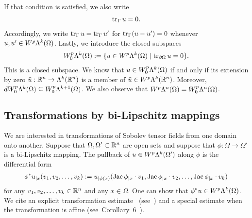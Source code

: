 \documentclass[10pt,a4paper]{article}
\newcommand{\todo}[1]{{\colorbox{yellow}{#1}}}
\newcommand\cye[1]{%
\protect\leavevmode
\begingroup
    \color{blue}%
    #1%
\endgroup
}
\begin{document}
If that condition is satisfied, we also write 
\begin{align*}
    \operatorname{tr}_{\Gamma} u = 0
    .
\end{align*}
Accordingly, we write $\operatorname{tr}_{\Gamma} u = \operatorname{tr}_{\Gamma} u'$ for $\operatorname{tr}_{\Gamma} (u-u') = 0$ whenever $u, u' \in W^{p}\Lambda^{k}(\Omega)$.
Lastly, we introduce the closed subspaces 
\begin{gather*}
    W^{p}_{0}\Alt^{k}(\Omega) 
    := 
    \{ u \in W^{p}\Alt^{k}(\Omega) \suchthat \trace_{\partial \Omega} u = 0 \}
    .
\end{gather*}
This is a closed subspace. We know that $u \in W^{p}_{0}\Lambda^{k}(\Omega)$ if and only if its extension by zero $\tilde u : {\mathbb R}^{n} \rightarrow \Lambda^{k}({\mathbb R}^{n})$ is a member of $\tilde u \in W^{p}\Lambda^{k}({\mathbb R}^{n})$. Moreover, $d W^{p}_{0}\Lambda^{k}(\Omega) \subseteq W^{p}_{0}\Lambda^{k+1}(\Omega)$. We also observe that $W^{p}\Lambda^{n}(\Omega) = W^{p}_{0}\Lambda^{n}(\Omega)$.


\subsection{Transformations by bi-Lipschitz mappings}

We are interested in transformations of Sobolev tensor fields from one domain onto another. 
Suppose that $\Omega,\Omega' \subset {\mathbb R}^{n}$ are open sets and suppose that $\phi: \Omega \to \Omega'$ is a bi-Lipschitz mapping.
The pullback of $u \in W^{p}\Lambda^{k}(\Omega')$ along $\phi$ is the differential form 
\begin{align} \label{equation:pullback}
    \phi^{\ast}u_{|x}( v_{1}, v_{2}, \ldots, v_{k} ) 
    := 
    u_{|\phi(x)}( \operatorname{{\rm Jac}}\phi_{|x} \cdot v_1, \operatorname{{\rm Jac}}\phi_{|x} \cdot v_2, \ldots, \operatorname{{\rm Jac}}\phi_{|x} \cdot v_k ) 
\end{align}
for any $v_1, v_2, \dots, v_k \in {\mathbb R}^{n}$ and any $x \in \Omega$. One can show that $\phi^{\ast}u \in W^{p}\Lambda^{k}(\Omega)$.
We cite an explicit transformation estimate~ (see~\cite{licht2019smoothed}) and a special estimate when the transformation is affine (see~Corollary~6~\cite{stern2013lp}).
\end{document}
